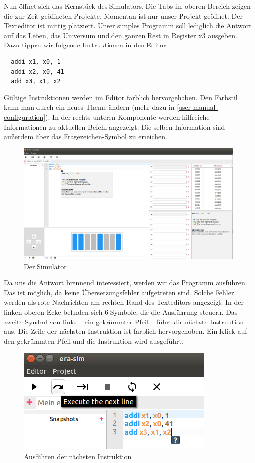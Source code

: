 Nun öffnet sich das Kernstück des Simulators. Die Tabs im oberen Bereich zeigen
die zur Zeit geöffneten Projekte. Momentan ist nur unser Projekt geöffnet. Der
Texteditor ist mittig platziert. Unser simples Programm soll lediglich die
Antwort auf das Leben, das Universum und den ganzen Rest in Register x3
ausgeben. Dazu tippen wir folgende Instruktionen in den Editor:
\begin{lstlisting}
  addi x1, x0, 1
  addi x2, x0, 41
  add x3, x1, x2
\end{lstlisting}
Gültige Instruktionen werden im Editor farblich hervorgehoben. Den Farbstil kann
man durch ein neues Theme ändern (mehr dazu in
\autoref{user-manual-configuration}). In der rechts unteren Komponente werden
hilfreiche Informationen zu aktuellen Befehl angezeigt. Die selben Information
sind außerdem über das Fragezeichen-Symbol zu erreichen.

\begin{figure}[H]
	\centering
	\includegraphics[scale=0.4]{Images/first-steps-2.png}
	\caption{Der Simulator}
\end{figure}

Da uns die Antwort brennend interessiert, werden wir das Programm ausführen. Das
ist möglich, da keine Übersetzungsfehler aufgetreten sind. Solche Fehler werden
als rote Nachrichten am rechten Rand des Texteditors angezeigt. In der linken
oberen Ecke befinden sich 6 Symbole, die die Ausführung steuern. Das zweite
Symbol von links -- ein gekrümmter Pfeil -- führt die nächste Instruktion aus.
Die Zeile der nächsten Instruktion ist farblich hervorgehoben. Ein Klick auf den
gekrümmten Pfeil und die Instruktion wird ausgeführt.
\begin{figure}[H]
	\centering
	\includegraphics[scale=1.0]{Images/first-steps-3.png}
	\caption{Ausführen der nächsten Instruktion}
\end{figure}

